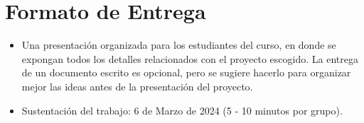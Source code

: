 \documentclass[12pt]{article}
\begin{document}
\section*{Formato de Entrega}

\begin{itemize}
    \item Una presentación organizada para los estudiantes del curso, en donde se expongan todos los detalles relacionados con el proyecto escogido. La entrega de un documento escrito es opcional, pero se sugiere hacerlo para organizar mejor las ideas antes de la presentación del proyecto.
    \item Sustentación del trabajo: 6 de Marzo de 2024 (5 - 10 minutos por grupo).
\end{itemize}
\end{document}
